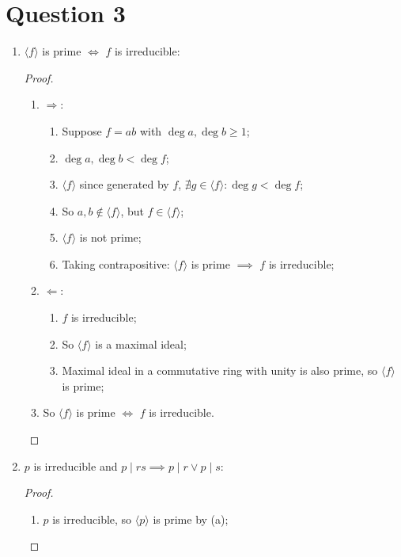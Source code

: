 \documentclass[11pt]{article}
\begin{document}
\newpage

\section*{Question 3}

\begin{enumerate}
    \item $\langle f\rangle$ is prime $\iff$ $f$ is irreducible:
    \begin{proof}
        ~
        \begin{enumerate}
            \item $\Rightarrow$:
            \begin{enumerate}
                \item Suppose $f=ab$ with $\deg a,\deg b\geq 1$;
                \item $\deg a,\deg b<\deg f$;
                \item $\langle f\rangle$ since generated by $f$, $\nexists g\in \langle f\rangle:\deg g<\deg f$;
                \item So $a,b\notin \langle f\rangle$, but $f\in\langle f\rangle$;
                \item $\langle f\rangle$ is not prime;
                \item Taking contrapositive: $\langle f\rangle$ is prime $\implies$ $f$ is irreducible;
            \end{enumerate}
            \item $\Leftarrow$:
            \begin{enumerate}
                \item $f$ is irreducible;
                \item So $\langle f\rangle$ is a maximal ideal;
                \item Maximal ideal in a commutative ring with unity is also prime, so $\langle f\rangle$ is prime;
            \end{enumerate}
            \item So $\langle f\rangle$ is prime $\iff$ $f$ is irreducible.
        \end{enumerate}
    \end{proof}
    \item $p$ is irreducible and $p\mid rs\implies p\mid r\lor p\mid s$:
    \begin{proof}
        ~
        \begin{enumerate}
            \item $p$ is irreducible, so $\langle p\rangle$ is prime by (a);

\end{enumerate}
\end{proof}
\end{enumerate}
\end{document}
